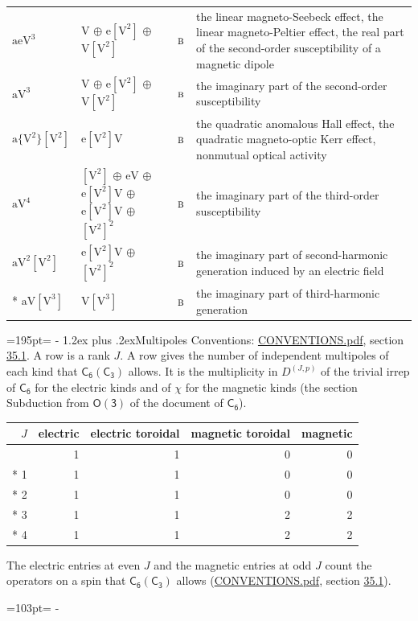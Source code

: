 \documentclass[10pt,a4paper]{article}
\makeatletter
\renewcommand\section{\@startsection{section}{1}{\z@}{-3ex plus -1ex minus -.2ex}%
  {1.2ex plus .2ex}{\normalfont\large\sffamily\bfseries\color{parttitle}}}
\newcommand{\needspace}[1]{\par\penalty-100\begingroup\dimen0=#1\relax\dimen2=\pagegoal
  \advance\dimen2-\pagetotal\ifdim\dimen0>\dimen2\relax\ifdim\dimen2>0pt\vfil\break\fi\fi
  \endgroup}
\numberwithin{equation}{section}
\newcommand{\grp}[1]{\mathsf{#1}}
\newcommand{\irr}[1]{\text{\normalfont\scshape #1}}
\newcommand{\irrJp}[2]{D^{(#1,#2)}}
\newcommand{\jahn}[1]{\mathrm{#1}}
\newlength{\fillwidth}\newlength{\cellwidth}\newlength{\colwidth}
\makeatother
\begin{document}
{\begin{longtable}{@{}lll>{\RaggedRight\arraybackslash}p{\fillwidth}@{}}
$\jahn{aeV^{3}}$ & $\jahn{V}$ $\oplus$ $\jahn{e[V^{2}]}$ $\oplus$ $\jahn{V[V^{2}]}$ & $\irr{b}$ & the linear magneto-Seebeck effect, the linear magneto-Peltier effect, the real part of the second-order susceptibility of a magnetic dipole\\
$\jahn{aV^{3}}$ & $\jahn{V}$ $\oplus$ $\jahn{e[V^{2}]}$ $\oplus$ $\jahn{V[V^{2}]}$ & $\irr{b}$ & the imaginary part of the second-order susceptibility\\
$\jahn{a\{V^{2}\}[V^{2}]}$ & $\jahn{e[V^{2}]V}$ & $\irr{b}$ & the quadratic anomalous Hall effect, the quadratic magneto-optic Kerr effect, nonmutual optical activity\\
$\jahn{aV^{4}}$ & $\jahn{[V^{2}]}$ $\oplus$ $\jahn{eV}$ $\oplus$ $\jahn{e[V^{2}]V}$ $\oplus$ $\jahn{e[V^{2}]V}$ $\oplus$ $\jahn{[V^{2}]^{2}}$ & $\irr{b}$ & the imaginary part of the third-order susceptibility\\
$\jahn{aV^{2}[V^{2}]}$ & $\jahn{e[V^{2}]V}$ $\oplus$ $\jahn{[V^{2}]^{2}}$ & $\irr{b}$ & the imaginary part of second-harmonic generation induced by an electric field\\*
$\jahn{aV[V^{3}]}$ & $\jahn{V[V^{3}]}$ & $\irr{b}$ & the imaginary part of third-harmonic generation\\
\bottomrule\end{longtable}}
\needspace{195pt}
\section{Multipoles}\label{s:multipoles}
Conventions: \href{../../CONVENTIONS.pdf}{CONVENTIONS.pdf}, section \href{../../CONVENTIONS.pdf\#conv.35.1}{35.1}.
A row is a rank $J$. \label{n:head.multipole.electric}\label{n:head.multipole.electric.toroidal}\label{n:head.multipole.magnetic.toroidal}\label{n:head.multipole.magnetic}A row gives the number of independent multipoles of each kind that $\grp{C_{6}}(\grp{C_{3}})$ allows. It is the multiplicity in $\irrJp{J}{p}$ of the trivial irrep of $\grp{C_{6}}$ for the electric kinds and of $\chi$ for the magnetic kinds (the section Subduction from $\grp{O(3)}$ of the document of \href{../../../rotation/data/pdf/C6.pdf}{$\grp{C_{6}}$}).
{\small\begin{longtable}{@{}rrrrr@{}}\toprule
$J$ & electric & electric toroidal & magnetic toroidal & magnetic\\\midrule\endhead
\bottomrule\endfoot\endlastfoot
0 & 1 & 1 & 0 & 0\\*
1 & 1 & 1 & 0 & 0\\*
2 & 1 & 1 & 0 & 0\\*
3 & 1 & 1 & 2 & 2\\*
4 & 1 & 1 & 2 & 2\\
\bottomrule\end{longtable}}
The electric entries at even $J$ and the magnetic entries at odd $J$ count the operators on a spin that $\grp{C_{6}}(\grp{C_{3}})$ allows (\href{../../CONVENTIONS.pdf}{CONVENTIONS.pdf}, section \href{../../CONVENTIONS.pdf\#conv.35.1}{35.1}).
\needspace{103pt}
\end{document}
